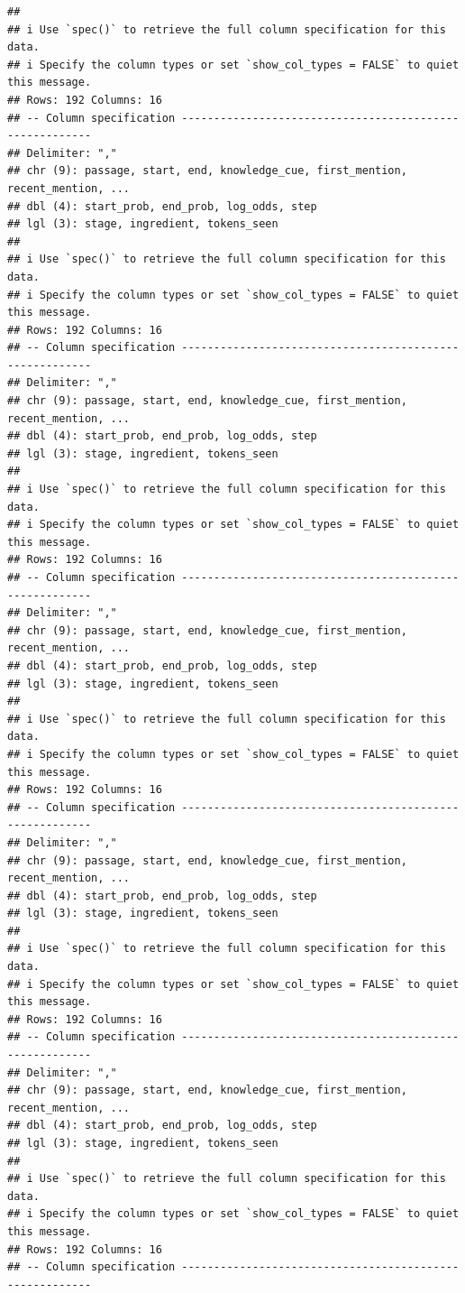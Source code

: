 \documentclass[
]{article}
\begin{document}
\begin{verbatim}
## 
## i Use `spec()` to retrieve the full column specification for this data.
## i Specify the column types or set `show_col_types = FALSE` to quiet this message.
## Rows: 192 Columns: 16
## -- Column specification --------------------------------------------------------
## Delimiter: ","
## chr (9): passage, start, end, knowledge_cue, first_mention, recent_mention, ...
## dbl (4): start_prob, end_prob, log_odds, step
## lgl (3): stage, ingredient, tokens_seen
## 
## i Use `spec()` to retrieve the full column specification for this data.
## i Specify the column types or set `show_col_types = FALSE` to quiet this message.
## Rows: 192 Columns: 16
## -- Column specification --------------------------------------------------------
## Delimiter: ","
## chr (9): passage, start, end, knowledge_cue, first_mention, recent_mention, ...
## dbl (4): start_prob, end_prob, log_odds, step
## lgl (3): stage, ingredient, tokens_seen
## 
## i Use `spec()` to retrieve the full column specification for this data.
## i Specify the column types or set `show_col_types = FALSE` to quiet this message.
## Rows: 192 Columns: 16
## -- Column specification --------------------------------------------------------
## Delimiter: ","
## chr (9): passage, start, end, knowledge_cue, first_mention, recent_mention, ...
## dbl (4): start_prob, end_prob, log_odds, step
## lgl (3): stage, ingredient, tokens_seen
## 
## i Use `spec()` to retrieve the full column specification for this data.
## i Specify the column types or set `show_col_types = FALSE` to quiet this message.
## Rows: 192 Columns: 16
## -- Column specification --------------------------------------------------------
## Delimiter: ","
## chr (9): passage, start, end, knowledge_cue, first_mention, recent_mention, ...
## dbl (4): start_prob, end_prob, log_odds, step
## lgl (3): stage, ingredient, tokens_seen
## 
## i Use `spec()` to retrieve the full column specification for this data.
## i Specify the column types or set `show_col_types = FALSE` to quiet this message.
## Rows: 192 Columns: 16
## -- Column specification --------------------------------------------------------
## Delimiter: ","
## chr (9): passage, start, end, knowledge_cue, first_mention, recent_mention, ...
## dbl (4): start_prob, end_prob, log_odds, step
## lgl (3): stage, ingredient, tokens_seen
## 
## i Use `spec()` to retrieve the full column specification for this data.
## i Specify the column types or set `show_col_types = FALSE` to quiet this message.
## Rows: 192 Columns: 16
## -- Column specification --------------------------------------------------------

\end{verbatim}
\end{document}
